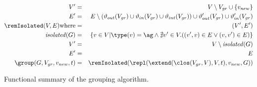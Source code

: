 \begin{table*}
\begin{eqnarray*}
   V' & %
   = & %
   V  \setminus V_{gr}  \cup \{v_{new}\}  \\
   E' &%
   = & %
   E \setminus (\vartheta_{out}(V_{gr}) \cup \vartheta_{in}(V_{gr}) \cup \vartheta_{int}(V_{gr}))  \cup \vartheta_{out}'(V_{gr})  \cup \vartheta_{in}'(V_{gr}) \\
    \remIsolated(V,E) \mathrm{where} & %
    = &%
    (V', E') \\
    \mathit{isolated}(G) & 
    = & %
    \{  v \in V | \type(v) = \ag  \wedge \nexists v' \in V . ((v',v) \in E \vee (v,v') \in E) \} \\
    V' & %
    = & %
    V \setminus \mathit{isolated}(G)\\
    E' &
    =&
    E \\
    \group(G, V_{gr}, v_{new}, t) &%
    = & %
    \remIsolated(\repl( \extend(\clos(V_{gr},V), V, t), v_{new},  G ))
  \end{eqnarray*}
  \caption{Functional summary of the grouping algorithm.}
  \label{alg-summary}
\end{table*}



% 
 
